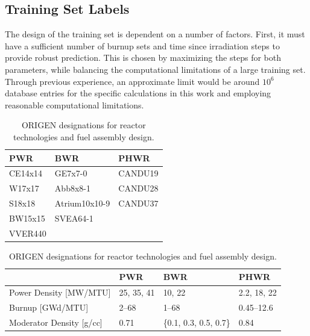 \subsection{Training Set Labels}
\label{sec:snflbls}

The design of the training set is dependent on a number of factors.  First, it
must have a sufficient number of burnup sets and time since irradiation steps
to provide robust prediction. This is chosen by maximizing the steps for both
parameters, while balancing the computational limitations of a large training
set. Through previous experience, an approximate limit would be around $10^6$
database entries for the specific calculations in this work and employing
reasonable computational limitations.

\begin{table}[!htb]
  \centering
  \begin{subtable}{\linewidth}
    \centering
    \begin{tabular}{@{}lll@{}}
    \toprule
      \textbf{PWR} & \textbf{BWR}  & \textbf{PHWR} \\ \toprule
      CE14x14      & GE7x7-0       & CANDU19       \\
      W17x17       & Abb8x8-1      & CANDU28       \\
      S18x18       & Atrium10x10-9 & CANDU37       \\
      BW15x15      & SVEA64-1      &               \\
      VVER440      &               &               \\ \bottomrule
    \end{tabular}
    \caption{\gls{ORIGEN} designations for reactor technologies and fuel assembly design.}
    \label{tbl:rxtrtype}
    \vspace*{5mm}
  \end{subtable}
  \begin{subtable}{\linewidth}
    \centering
    \begin{tabular}{@{}llll@{}}
      \toprule
                               & \textbf{PWR}                     & \textbf{BWR}                     & \textbf{PHWR} \\ \toprule
      Power Density [MW/MTU]   & 25, 35, 41                       & 10, 22                           & 2.2, 18, 22   \\
      Burnup [GWd/MTU]         & 2--68                            & 1--68                            & 0.45--12.6    \\
      Moderator Density [g/cc] & 0.71                             & \{0.1, 0.3, 0.5, 0.7\}           & 0.84          \\

\end{tabular}
\end{subtable}
\end{table}

